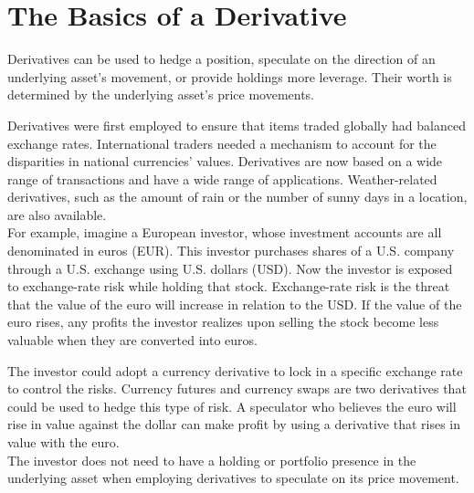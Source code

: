 \documentclass[a4 paper, 12pt]{report}
\theoremstyle{plain}
\begin{document}
\section{The Basics of a Derivative}
\noindent
\par Derivatives can be used to hedge a position, speculate on the direction of an
underlying asset's movement, or provide holdings more leverage. Their worth is
determined by the underlying asset's price movements.\\
\par Derivatives were first employed to ensure that items traded globally had balanced
exchange rates. International traders needed a mechanism to account for the disparities
in national currencies' values. Derivatives are now based on a wide range of transactions
and have a wide range of applications. Weather-related derivatives, such as the amount
of rain or the number of sunny days in a location, are also available.\\
For example, imagine a European investor, whose investment accounts are all
denominated in euros (EUR). This investor purchases shares of a U.S. company through a
U.S. exchange using U.S. dollars (USD). Now the investor is exposed to exchange-rate risk
while holding that stock. Exchange-rate risk is the threat that the value of the euro will
increase in relation to the USD. If the value of the euro rises, any profits the investor
realizes upon selling the stock become less valuable when they are converted into euros.\\
\par The investor could adopt a currency derivative to lock in a specific exchange rate to
control the risks. Currency futures and currency swaps are two derivatives that could be
used to hedge this type of risk. A speculator who believes the euro will rise in value
against the dollar can make profit by using a derivative that rises in value with the euro.\\
The investor does not need to have a holding or portfolio presence in the underlying
asset when employing derivatives to speculate on its price movement.
\end{document}
